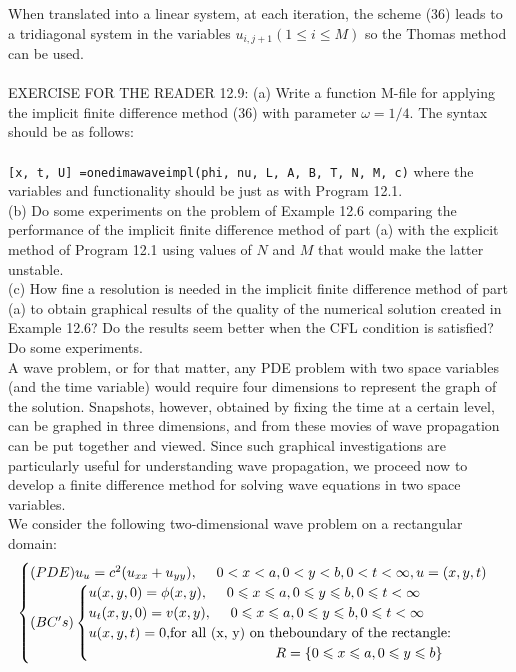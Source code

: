 \documentclass[../main.tex]{subfiles}
\begin{document}
When translated into a linear system, at each iteration, the scheme (36) leads to a tridiagonal system in the variables $u_{i,j+1} (1\leqslant i \leqslant M)$ so the Thomas method can be used. 
\\
\\
EXERCISE FOR THE READER 12.9: (a) Write a function M-file for applying the implicit finite difference method (36) with parameter $\omega = 1/4$. The syntax should be as follows: 
\\
\\
\texttt{[x, t, U] =onedimawaveimpl(phi, nu, L, A, B, T, N, M, c)}
where the variables and functionality should be just as with Program 12.1. 
\\
(b) Do some experiments on the problem of Example 12.6 comparing the performance of the implicit finite difference method of part (a) with the explicit method of Program 12.1 using values of $N$ and $M$ that would make the latter 
unstable.
\\
(c) How fine a resolution is needed in the implicit finite difference method of part (a) to obtain graphical results of the quality of the numerical solution created in Example 12.6? Do the results seem better when the CFL condition is satisfied? Do some experiments.
\\


A wave problem, or for that matter, any PDE problem with two space variables (and the time variable) would require four dimensions to represent the graph of the solution. Snapshots, however, obtained by fixing the time at a certain level, can be graphed in three dimensions, and from these movies of wave propagation can be put together and viewed. Since such graphical investigations are particularly useful for understanding wave propagation, we proceed now to develop a finite difference method for solving wave equations in two space variables.
\\

We consider the following two-dimensional wave problem on a rectangular 
domain:
\begin{equation}\label{eqa37}
	\begin{cases} 
	(PDE) u_u=c^2 (u_{xx}+u_{yy}),~~~~0<x<a, 0<y<b,0<t<\infty,u=(x,y,t)\\
(BC's)
		\begin{cases}
		u(x,y,0)=\phi(x,y), ~~~~ 0\leqslant x \leqslant a,0\leqslant y \leqslant b, 0 \leqslant t< \infty \\
		u_t(x,y,0)=v(x,y), ~~~~ 0\leqslant x \leqslant a,0\leqslant y \leqslant b, 0 \leqslant t< \infty \\
		 u(x, y, t) = 0, $for all (x, y) on theboundary of the rectangle:$\\
		 ~~~~~~~~~~~~~~~~~~~~~~~~~~~~~~~~~~~~~~~~ R= \lbrace 0\leqslant x\leqslant a, 0\leqslant y \leqslant b \rbrace
		\end{cases} 
	\end{cases}
\end{equation}
\end{document}
